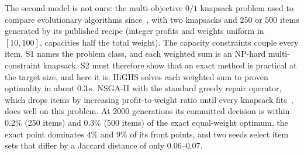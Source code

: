 \documentclass[systems,article,accept,moreauthors,pdftex]{Definitions/mdpi}
\begin{document}
The second model is not ours: the multi-objective $0/1$ knapsack problem used to compare
evolutionary algorithms since~\cite{zitzler1999spea}, with two knapsacks and $250$ or $500$
items generated by its published recipe (integer profits and weights uniform in $[10, 100]$,
capacities half the total weight). The capacity constraints couple every item, S1 names the
problem class, and each weighted sum is an NP-hard multi-constraint knapsack. S2 must therefore
show that an exact method is practical at the target size, and here it is: HiGHS solves each
weighted sum to proven optimality in about $0.3$\,s. NSGA-II with the standard greedy repair
operator, which drops items by increasing profit-to-weight ratio until every knapsack
fits~\cite{zitzler1999spea}, does well on this problem. At $2000$ generations its committed
decision is within $0.2\%$ (250 items) and $0.3\%$ (500 items) of the exact equal-weight optimum,
the exact point dominates $4\%$ and $9\%$ of its front points, and two seeds select item sets
that differ by a Jaccard distance of only $0.06$--$0.07$.
\end{document}
